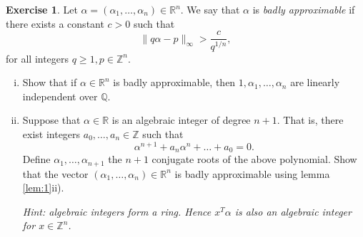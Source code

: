 \documentclass[12pt,a4paper]{article}
\theoremstyle{plain}
\newtheorem*{Sol*}{Solution}
\theoremstyle{definition}
\newtheorem{Ex}{Exercise}
\def \Q {\mathbb Q}
\def \R {\mathbb R}
\def \Z {\mathbb Z}
\newif\ifsolutions
\newcommand{\exercise}[2]{
			\begin{Ex} #1 \end{Ex}
			\ifsolutions  \begin{Sol*} #2 \end{Sol*} \bigskip \else \bigskip  \fi
		}
\begin{document}
\exercise{
	Let $\alpha = (\alpha_1, \dots, \alpha_n) \in \R^n$. We say that $\alpha$ is \emph{badly approximable} if there exists a constant $c > 0$ such that
		\[ \| q \alpha - p \|_\infty > \frac{c}{q^{1/n}}, \]
	for all integers $q \geq 1, p \in \Z^n$.

	\begin{enumerate}[i)]
		\item Show that if $\alpha \in \R^n$ is badly approximable, then $1, \alpha_1, \dots, \alpha_n$ are linearly independent over $\Q$.
		\item Suppose that $\alpha \in \R$ is an algebraic integer of degree $n+1$. That is, there exist integers $a_0, \dots, a_{n} \in \Z$ such that
			\[ \alpha^{n+1} + a_{n} \alpha^{n} + \dots +  a_{0} = 0. \]
		Define $\alpha_1, \dots, \alpha_{n+1}$ the $n+1$ conjugate roots of the above polynomial.
		Show that the vector $(\alpha_1, \dots, \alpha_n) \in \R^n$ is badly approximable using lemma \ref{lem:1}ii).

		\emph{Hint: algebraic integers form a ring. Hence $x^T \alpha$ is also an algebraic integer for $x \in \Z^n$.}
	\end{enumerate}
}
{}
\end{document}
